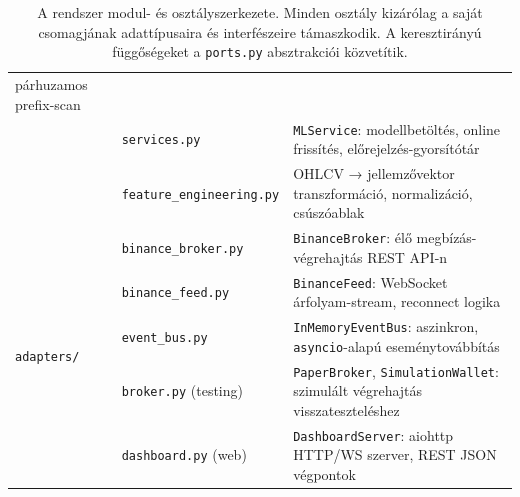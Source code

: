\begin{table}[H]
\begin{tabular}{|l|p{4.2cm}|p{6.3cm}|}
                                          párhuzamos prefix-scan \\
      & \texttt{services.py}           & \texttt{MLService}: modellbetöltés,
                                          online frissítés, előrejelzés-gyorsítótár \\
      & \texttt{feature\_engineering.py} & OHLCV → jellemzővektor transzformáció,
                                            normalizáció, csúszóablak \\
    \hline
    \multirow{5}{*}{\texttt{adapters/}}
      & \texttt{binance\_broker.py}    & \texttt{BinanceBroker}: élő megbízás-végrehajtás
                                          REST API-n \\
      & \texttt{binance\_feed.py}      & \texttt{BinanceFeed}: WebSocket árfolyam-stream,
                                          reconnect logika \\
      & \texttt{event\_bus.py}         & \texttt{InMemoryEventBus}: aszinkron,
                                          \texttt{asyncio}-alapú eseménytovábbítás \\
      & \texttt{broker.py} (testing)   & \texttt{PaperBroker}, \texttt{SimulationWallet}:
                                          szimulált végrehajtás visszateszteléshez \\
      & \texttt{dashboard.py} (web)    & \texttt{DashboardServer}: aiohttp HTTP/WS
                                          szerver, REST JSON végpontok \\
    \hline
  \end{tabular}
  \caption{A rendszer modul- és osztályszerkezete. Minden osztály kizárólag a
           saját csomagjának adattípusaira és interfészeire támaszkodik.
           A keresztirányú függőségeket a \texttt{ports.py} absztrakciói
           közvetítik.}
  \label{tab:module_structure}
\end{table}
